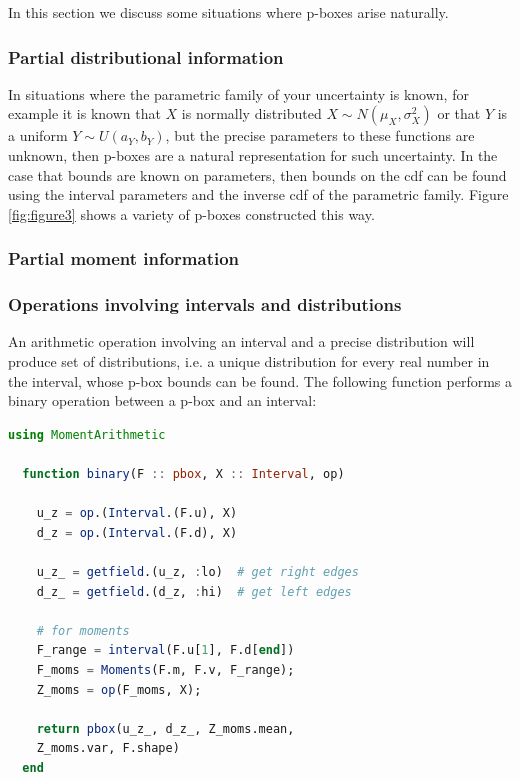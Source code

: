 \documentclass{juliacon}
\begin{document}
In this section we discuss some situations where p-boxes arise naturally.


\subsubsection{Partial distributional information} \hfill \break

In situations where the parametric family of your uncertainty is known, for example it is known that $X$ is normally distributed $X \sim N(\mu_{X}, \sigma_{X}^{2})$ or that $Y$ is a uniform $Y \sim U(a_{Y},b_{Y})$, but the precise parameters to these functions are unknown, then p-boxes are a natural representation for such uncertainty. In the case that bounds are known on parameters, then bounds on the cdf can be found using the interval parameters and the inverse cdf of the parametric family. Figure \ref{fig:figure3} shows a variety of p-boxes constructed this way.


\subsubsection{Partial moment information} %
\label{section:Moments}


\subsubsection{Operations involving intervals and distributions} \hfill \break

An arithmetic operation involving an interval and a precise distribution will produce set of distributions, i.e. a unique distribution for every real number in the interval, whose p-box bounds can be found. The following function performs a binary operation between a p-box and an interval:

\begin{lstlisting}[language = Julia]
  using MomentArithmetic

  function binary(F :: pbox, X :: Interval, op)

    u_z = op.(Interval.(F.u), X)
    d_z = op.(Interval.(F.d), X)

    u_z_ = getfield.(u_z, :lo)  # get right edges
    d_z_ = getfield.(d_z, :hi)  # get left edges

    # for moments
    F_range = interval(F.u[1], F.d[end])
    F_moms = Moments(F.m, F.v, F_range);
    Z_moms = op(F_moms, X);

    return pbox(u_z_, d_z_, Z_moms.mean, 
    Z_moms.var, F.shape)
  end
\end{lstlisting}
\end{document}
